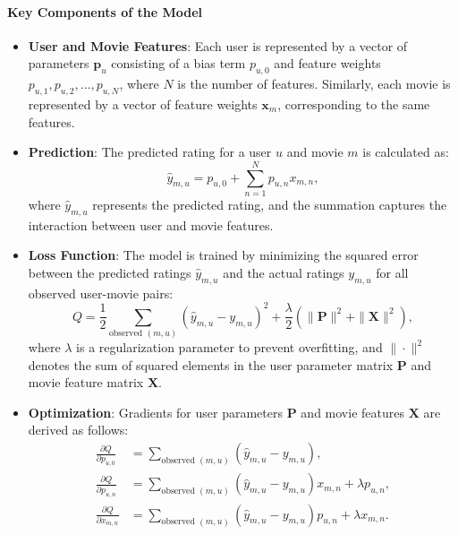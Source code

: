 \documentclass[a4paper,9pt]{article}
\begin{document}
\paragraph{Key Components of the Model}

\begin{itemize}
	\item \textbf{User and Movie Features}:
	      Each user is represented by a vector of parameters \( \mathbf{p}_u \) consisting of a bias term \( p_{u,0} \) and feature weights \( p_{u,1}, p_{u,2}, \dots, p_{u,N} \), where \( N \) is the number of features.
	      Similarly, each movie is represented by a vector of feature weights \( \mathbf{x}_m \), corresponding to the same features.

	\item \textbf{Prediction}:
	      The predicted rating for a user \( u \) and movie \( m \) is calculated as:
	      \[
		      \hat{y}_{m,u} = p_{u,0} + \sum_{n=1}^N p_{u,n} x_{m,n},
	      \]
	      where \( \hat{y}_{m,u} \) represents the predicted rating, and the summation captures the interaction between user and movie features.

	\item \textbf{Loss Function}:
	      The model is trained by minimizing the squared error between the predicted ratings \( \hat{y}_{m,u} \) and the actual ratings \( y_{m,u} \) for all observed user-movie pairs:
	      \[
		      Q = \frac{1}{2} \sum_{\text{observed } (m, u)} \left( \hat{y}_{m,u} - y_{m,u} \right)^2 + \frac{\lambda}{2} \left( \|\mathbf{P}\|^2 + \|\mathbf{X}\|^2 \right),
	      \]
	      where \( \lambda \) is a regularization parameter to prevent overfitting, and \( \|\cdot\|^2 \) denotes the sum of squared elements in the user parameter matrix \( \mathbf{P} \) and movie feature matrix \( \mathbf{X} \).

	\item \textbf{Optimization}:
	      Gradients for user parameters \( \mathbf{P} \) and movie features \( \mathbf{X} \) are derived as follows:
	      \begin{align*}
		      \frac{\partial Q}{\partial p_{u,0}} & = \sum_{\text{observed } (m,u)} (\hat{y}_{m,u} - y_{m,u}),                           \\
		      \frac{\partial Q}{\partial p_{u,n}} & = \sum_{\text{observed } (m,u)} (\hat{y}_{m,u} - y_{m,u}) x_{m,n} + \lambda p_{u,n}, \\
		      \frac{\partial Q}{\partial x_{m,n}} & = \sum_{\text{observed } (m,u)} (\hat{y}_{m,u} - y_{m,u}) p_{u,n} + \lambda x_{m,n}.
	      \end{align*}


\end{itemize}
\end{document}
